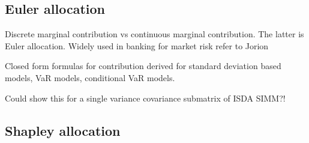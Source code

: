 \documentclass[../Thesis_AHoecherl.tex]{subfiles}
\begin{document}

\subsection{Euler allocation}\label{sec:Euler allocation}

Discrete marginal contribution vs continuous marginal contribution. The latter is Euler allocation. Widely used in banking for market risk refer to Jorion

Closed form formulas for contribution derived for standard deviation based models, VaR models, conditional VaR models.

Could show this for a single variance covariance submatrix of ISDA SIMM?!

\subsection{Shapley allocation}

\end{document}
